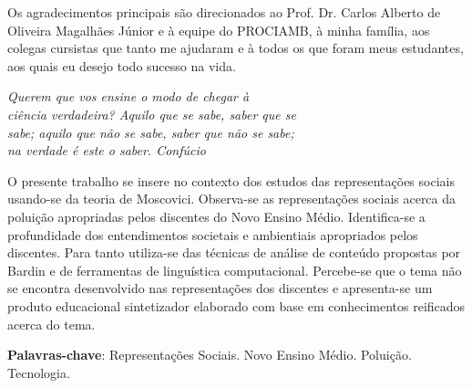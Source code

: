 \documentclass[
  12pt,       %
  openright,      %
  twoside,      %
  a4paper,      %
  english,      %
  french,       %
  spanish,      %
  brazil        %
  ]{abntex2}
\begin{document}
\begin{agradecimentos}
Os agradecimentos principais são direcionados ao Prof. Dr. Carlos Alberto de Oliveira Magalhães Júnior e à equipe do PROCIAMB, à minha família, aos colegas cursistas que tanto me ajudaram e à todos os que foram meus estudantes, aos quais eu desejo todo sucesso na vida.

\end{agradecimentos}

\begin{epigrafe}
    \vspace*{\fill}
  \begin{flushright}
    \textit{Querem que vos ensine o modo de chegar à \\
    ciência verdadeira? Aquilo que se sabe, saber que se \\
    sabe; aquilo que não se sabe, saber que não se sabe; \\
    na verdade é este o saber. Confúcio}
  \end{flushright}
\end{epigrafe}


\setlength{\absparsep}{18pt} %
\begin{resumo}
 O presente trabalho se insere no contexto dos estudos das representações sociais usando-se da teoria de Moscovici. Observa-se as representações sociais acerca da poluição apropriadas pelos discentes do Novo Ensino Médio. Identifica-se a profundidade dos entendimentos societais e ambientiais apropriados pelos discentes. Para tanto utiliza-se das técnicas de análise de conteúdo propostas por Bardin e de ferramentas de linguística computacional. Percebe-se que o tema não se encontra desenvolvido nas representações dos discentes e apresenta-se um produto educacional sintetizador elaborado com base em conhecimentos reificados acerca do tema.

 \textbf{Palavras-chave}: Representações Sociais. Novo Ensino Médio. Poluição. Tecnologia.
\end{resumo}
\end{document}
